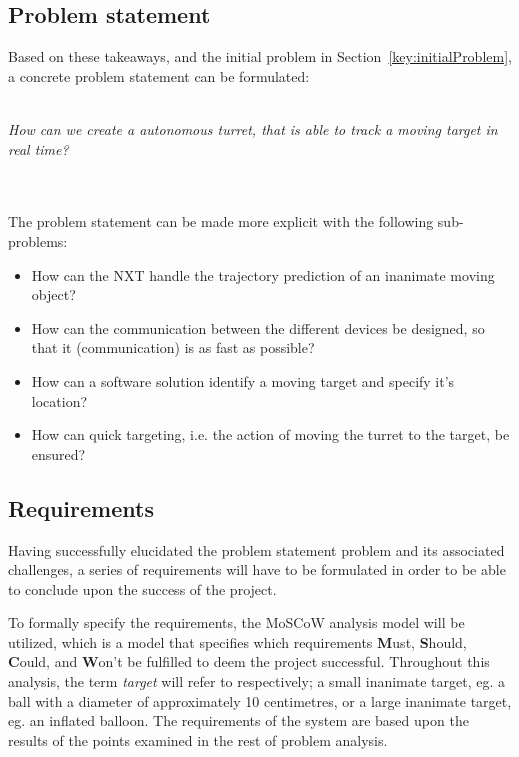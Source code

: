 \subsection{Problem statement}
Based on these takeaways, and the initial problem in Section~\ref{key:initialProblem}, a concrete problem statement can be formulated:\\~\\
\begin{center}

	\textit{\large{How can we create a autonomous turret, that is able to track a moving target in real time?}}
\end{center}~\\~\\

The problem statement can be made more explicit with the following sub-problems:
\begin{center}
	\begin{itemize}
		\item How can the NXT handle the trajectory prediction of an inanimate moving object?
		\item How can the communication between the different devices be designed, so that it (communication) is as fast as possible?
		\item How can a software solution identify a moving target and specify it's location?
		\item How can quick targeting, i.e. the action of moving the turret to the target, be ensured?
	\end{itemize}
\end{center}


\subsection{Requirements}\label{subsec:requirements}
Having successfully elucidated the problem statement problem and its associated challenges, a series  of requirements will have to be formulated in order to be able to conclude upon the success of the project.


To formally specify the requirements, the MoSCoW analysis model will be utilized, which is a model that specifies which requirements \textbf{M}ust, \textbf{S}hould, \textbf{C}ould, and \textbf{W}on't be fulfilled to deem the project successful. 
Throughout this analysis, the term \textit{target} will refer to respectively; a small inanimate target, eg{.} a ball with a diameter of approximately 10 centimetres, or a large inanimate target, eg{.} an inflated balloon.
The requirements of the system are based upon the results of the points examined in the rest of problem analysis.

